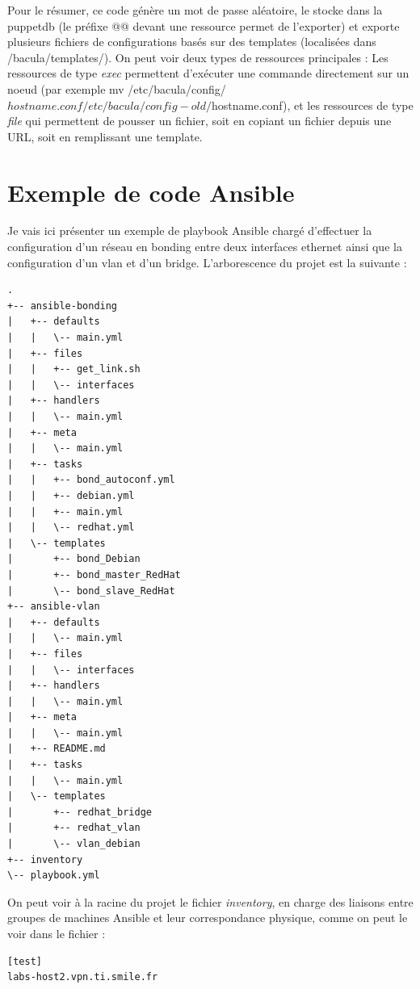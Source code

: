 \documentclass[14 pt,a4paper]{extreport}
\begin{document}
Pour le résumer, ce code génère un mot de passe aléatoire, le stocke dans la puppetdb (le préfixe @@ devant une ressource permet de l'exporter) et exporte plusieurs fichiers de configurations basés sur des templates (localisées dans /bacula/templates/). On peut voir deux types de ressources principales : Les ressources de type \emph{exec} permettent d'exécuter une commande directement sur un noeud (par exemple mv /etc/bacula/config/${hostname}.conf /etc/bacula/config-old/${hostname}.conf), et les ressources de type \emph{file} qui permettent de pousser un fichier, soit en copiant un fichier depuis une URL, soit en remplissant une template.

\chapter{Exemple de code Ansible}

Je vais ici présenter un exemple de playbook Ansible chargé d'effectuer la configuration d'un réseau en bonding entre deux interfaces ethernet ainsi que la configuration d'un vlan et d'un bridge. L'arborescence du projet est la suivante :

\begin{framed}
\begin{Verbatim}[fontsize=\tiny]
.
+-- ansible-bonding
|   +-- defaults
|   |   \-- main.yml
|   +-- files
|   |   +-- get_link.sh
|   |   \-- interfaces
|   +-- handlers
|   |   \-- main.yml
|   +-- meta
|   |   \-- main.yml
|   +-- tasks
|   |   +-- bond_autoconf.yml
|   |   +-- debian.yml
|   |   +-- main.yml
|   |   \-- redhat.yml
|   \-- templates
|       +-- bond_Debian
|       +-- bond_master_RedHat
|       \-- bond_slave_RedHat
+-- ansible-vlan
|   +-- defaults
|   |   \-- main.yml
|   +-- files
|   |   \-- interfaces
|   +-- handlers
|   |   \-- main.yml
|   +-- meta
|   |   \-- main.yml
|   +-- README.md
|   +-- tasks
|   |   \-- main.yml
|   \-- templates
|       +-- redhat_bridge
|       +-- redhat_vlan
|       \-- vlan_debian
+-- inventory
\-- playbook.yml\end{Verbatim}
\end{framed}

On peut voir à la racine du projet le fichier \emph{inventory}, en charge des liaisons entre groupes de machines Ansible et leur correspondance physique, comme on peut le voir dans le fichier :

\begin{framed}
\begin{Verbatim}[fontsize=\scriptsize]
[test]
labs-host2.vpn.ti.smile.fr
\end{Verbatim}
\end{framed}
\end{document}
